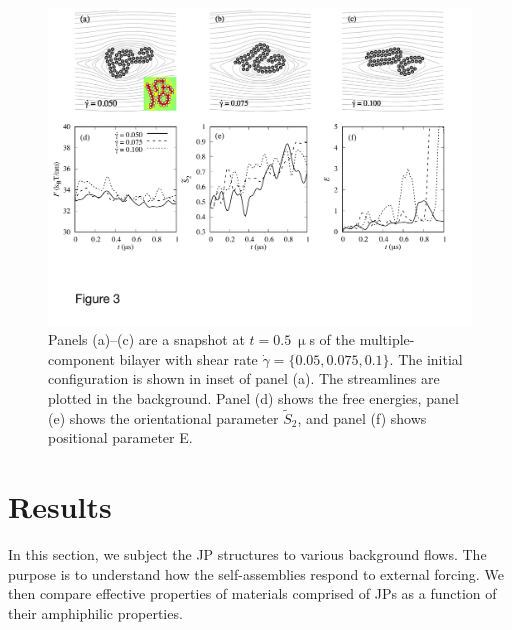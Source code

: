 \documentclass[prb,preprint,showpacs,preprintnumbers,amsmath,amssymb,longbibliography]{revtex4-1}
\begin{document}
\begin{figure}
  \begin{center}
   \includegraphics[width=1.0\textwidth]{Figures/Figure3.pdf}
  \end{center}
  \caption{
    \label{fig:BC1_shear}
    Panels (a)--(c) are a snapshot at $t=0.5\ \upmu$s of the
    multiple-component bilayer with shear rate $\dot \gamma = \{0.05,
    0.075, 0.1\}$. The initial configuration is shown in inset of panel
    (a). The streamlines are plotted in the background. Panel (d) shows
    the free energies, panel (e) shows the orientational parameter
    $\tilde{S}_2$, and panel (f) shows positional parameter E.}
\end{figure}



\section{Results}
\label{sec:results}
In this section, we subject the JP structures to various
background flows. The purpose is to understand how the self-assemblies
respond to external forcing. We then compare effective
properties of materials comprised of JPs as a function of
their amphiphilic properties.
\end{document}

